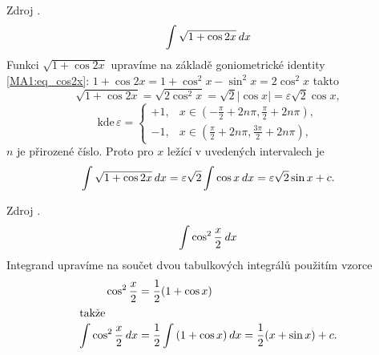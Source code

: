       \begin{example}
        Zdroj \cite[s.~30]{Knichal}.
        \begin{equation}\label{MA:int_ex_04}
          \int{\sqrt{1+\cos2x}\hspace{2pt}dx}
        \end{equation}
        Funkci $\sqrt{1+\cos2x}$ upravíme na základě goniometrické identity \ref{MA1:eq_cos2x}:
        \(1+\cos2x = 1+\cos^2x-\sin^2x=2\cos^2x\) takto
        \begin{equation*}
          \sqrt{1+\cos2x} =\sqrt{2\cos^2x} = \sqrt{2}|\cos x| = \varepsilon\sqrt{2}\cos x, 
        \end{equation*}
        \begin{equation*}
          \text{kde}\,\varepsilon =
            \begin{cases} 
             +1, &  x\in \left(-\frac{\pi}{2}+2n\pi,\frac{\pi}{2}+2n\pi\right), \\
             -1, &  x\in \left(\frac{\pi}{2}+2n\pi,\frac{3\pi}{2}+2n\pi\right),
            \end{cases}
        \end{equation*}
        $n$ je přirozené číslo. Proto pro $x$ ležící v uvedených intervalech je
        \begin{equation*}
          \int\sqrt{1+\cos2x}\hspace{2pt}dx = \varepsilon\sqrt{2}\int\cos x\hspace{2pt}dx 
                                 = \varepsilon\sqrt{2}\sin x + c.
        \end{equation*}
      \end{example}
      
      \begin{example}Zdroj \cite[s.~30]{Knichal}.
        \begin{equation}\label{MA:int_ex_05}
          \int\cos^2\frac{x}{2}\hspace{2pt}dx
        \end{equation}
        Integrand upravíme na součet dvou tabulkových integrálů použitím vzorce
        \begin{align*}
          \cos^2\frac{x}{2} &= \frac{1}{2}(1+\cos x)     \\ 
          \shortintertext{takže}
          \int{\cos^2\frac{x}{2}}\hspace{2pt}dx 
                            &= \frac{1}{2}\int{(1+\cos x)}\hspace{2pt}dx = \frac{1}{2}(x+\sin x) + c.
        \end{align*}          
      \end{example}
      
